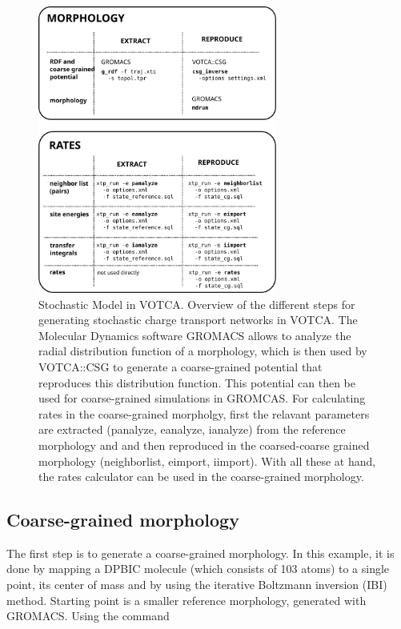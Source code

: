 \begin{figure}[h]
\includegraphics[width=0.7\textwidth]{fig/stochastic/overview_stochastic}
\caption{Stochastic Model in VOTCA. Overview of the different steps for generating stochastic charge transport networks in VOTCA. The Molecular Dynamics software GROMACS allows to analyze the radial distribution function of a morphology, which is then used by VOTCA::CSG to generate a coarse-grained potential that reproduces this distribution function. This potential can then be used for coarse-grained simulations in GROMCAS. For calculating rates in the coarse-grained morpholgy, first the relavant parameters are extracted (panalyze, eanalyze, ianalyze) from the reference morphology and and then reproduced in the coarsed-coarse grained morphology (neighborlist, eimport, iimport). With all these at hand, the rates calculator can be used in the coarse-grained morphology.}
\label{fig:overview_stochastic}
\end{figure}

\subsection{Coarse-grained morphology}
The first step is to generate a coarse-grained morphology. In this example, it is done by mapping a DPBIC molecule (which consists of 103 atoms) to a single point, its center of mass and by using the iterative Boltzmann inversion (IBI) method. Starting point is a smaller reference morphology, generated with GROMACS. Using the command

